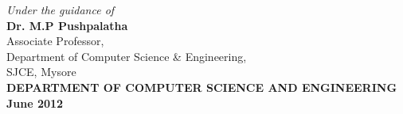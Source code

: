 \documentclass[11pt,a4paper]{report}
\begin{document}
\begin{titlepage}
\begin{center}
\emph{Under the guidance of} \\
\textbf{Dr. M.P Pushpalatha} \\
Associate Professor, \\
Department of Computer Science \& Engineering, \\
SJCE, Mysore \\[1cm]


\small{\textbf{DEPARTMENT OF COMPUTER SCIENCE AND ENGINEERING}} \\
\small{\textbf{June 2012}} \\


\end{center}
\end{titlepage}
\end{document}
